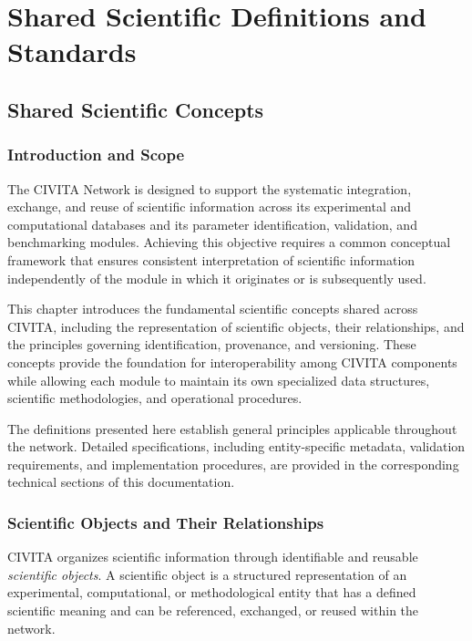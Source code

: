
\part{Shared Scientific Definitions and Standards}



\chapter{Shared Scientific Concepts}

\section{Introduction and Scope}

The CIVITA Network is designed to support the systematic integration, exchange, and reuse of scientific information across its experimental and computational databases and its parameter identification, validation, and benchmarking modules. Achieving this objective requires a common conceptual framework that ensures consistent interpretation of scientific information independently of the module in which it originates or is subsequently used.

This chapter introduces the fundamental scientific concepts shared across CIVITA, including the representation of scientific objects, their relationships, and the principles governing identification, provenance, and versioning. These concepts provide the foundation for interoperability among CIVITA components while allowing each module to maintain its own specialized data structures, scientific methodologies, and operational procedures.

The definitions presented here establish general principles applicable throughout the network. Detailed specifications, including entity-specific metadata, validation requirements, and implementation procedures, are provided in the corresponding technical sections of this documentation.

\section{Scientific Objects and Their Relationships}

CIVITA organizes scientific information through identifiable and reusable \emph{scientific objects}. A scientific object is a structured representation of an experimental, computational, or methodological entity that has a defined scientific meaning and can be referenced, exchanged, or reused within the network.

